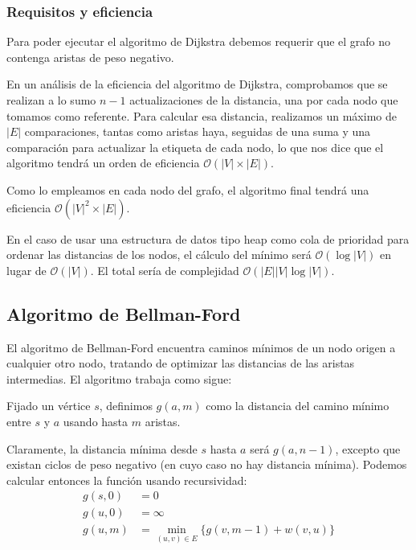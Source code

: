 \documentclass[a4paper, 11pt]{article} %
\begin{document}
    \subsubsection{Requisitos y eficiencia}
      Para poder ejecutar el algoritmo de Dijkstra debemos requerir que el grafo
      no contenga aristas de peso negativo.
      
      En un análisis de la eficiencia del algoritmo de Dijkstra, comprobamos que se realizan a lo sumo 
      $n-1$ actualizaciones de la distancia, una por cada nodo que tomamos como referente. Para calcular 
      esa distancia, realizamos un máximo de $|E|$ comparaciones, tantas como aristas haya, seguidas de 
      una suma y una comparación para actualizar la etiqueta de cada nodo, lo que nos dice que el 
      algoritmo tendrá un orden de eficiencia $\mathcal{O}(|V|\times |E|)$. 
      
      Como lo empleamos en cada nodo del grafo, el algoritmo final tendrá una eficiencia $\mathcal{O}(|V|^2\times |E|)$. 

      En el caso de usar una estructura de datos tipo heap como cola de prioridad para
      ordenar las distancias de los nodos, el cálculo del mínimo será $\mathcal{O}(\log|V|)$ 
      en lugar de $\mathcal{O}(|V|)$. El total sería de complejidad  $\mathcal{O}(|E||V|\log|V|)$.
      
  \subsection{Algoritmo de Bellman-Ford}
	El algoritmo de Bellman-Ford encuentra caminos mínimos de un nodo origen a cualquier otro nodo, tratando de 
	optimizar las distancias de las aristas intermedias. El algoritmo trabaja como sigue: 
	
    Fijado un vértice $s$, definimos $g(a,m)$ como la distancia del camino mínimo entre $s$ y $a$
    usando hasta $m$ aristas.
    
    Claramente, la distancia mínima desde $s$ hasta $a$ será $g(a,n-1)$, excepto que existan ciclos de peso 
    negativo (en cuyo caso no hay distancia mínima). Podemos calcular entonces la función usando recursividad:
    \begin{equation} 
      \begin{split}
	g(s,0)  &=  0 \\
	g(u,0)  &=  \infty \\
	g(u,m)  &=  \min_{(u,v) \in E} \{g(v,m-1) + w(v,u)\} \\
      \end{split}
    \end{equation}
\end{document}
